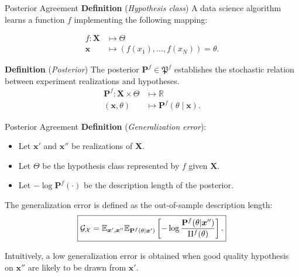 \begin{frame}
    \centering
    \Huge{\insertsection}  %
\end{frame}

\begin{frame}{Posterior Agreement}
	\textbf{Definition} (\textit{Hypothesis class})
    A data science algorithm learns a function $f$ implementing the following mapping:

    $$
    \begin{aligned}
        f: \bm{X} & \longmapsto \Theta \\
        \bm{x}  & \longmapsto (f(x_1), \dots, f(x_N)) = \theta.
    \end{aligned}
    $$

	\textbf{Definition} (\textit{Posterior})
	The posterior $\mathbf{P}^f \in \mathfrak{P}^f$ establishes the stochastic relation between experiment realizations and hypotheses.
	$$
	\begin{aligned}
		\mathbf{P}^f: \bm{X} \times \Theta & \longmapsto \mathbb{R} \\
		(\bm{x}, \theta) & \longmapsto \mathbf{P}^f (\theta \mid \bm{x}).
	\end{aligned}
	$$
\end{frame}

\begin{frame}{Posterior Agreement}
	\textbf{Definition} (\textit{Generalization error}):
	\begin{itemize}
		\item Let $\bm{x'}$ and $\bm{x''}$ be realizations of $\bm{X}$.
		\item Let $\Theta$ be the hypothesis class represented by $f$ given $\bm{X}$. 
		\item Let $- \log \mathbf{P}^f (\cdot)$ be the description length of the posterior.
		
	\end{itemize}
		The generalization error is defined as the out-of-sample description length:
		$$
		\textcolor{black}{
        \boxed{
			\mathcal{G}_{\mathcal{X}} = \mathbb{E}_{\bm{x}', \bm{x}''} \mathbb{E}_{\mathbf{P}^f( \theta \mid \bm{x}')} \left[ - \log \frac{\mathbf{P}^f(\theta | \bm{x}'')}{\Pi^f (\theta)} \right].
			}
		}
		$$

		Intuitively, a low generalization error is obtained when good quality hypothesis
		on $\bm{x}''$ are likely to be drawn from $\bm{x}'$. 
\end{frame}

